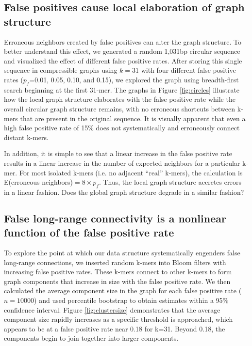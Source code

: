 \documentclass{pnastwo}
\begin{document}
\begin{article}
\subsection{False positives cause local elaboration of graph structure}

Erroneous neighbors created by false positives can alter the graph
structure.  To better understand this effect, we generated a random
1,031bp circular sequence and visualized the effect of different false
positive rates.  After storing this single sequence in compressible
graphs using $k=31$ with four different false positive rates
($p_f$=0.01, 0.05, 0.10, and 0.15), we explored the graph using
breadth-first search beginning at the first 31-mer.  The graphs in
Figure \ref{fig:circles} illustrate how the local graph structure
elaborates with the false positive rate while the overall circular
graph structure remains, with no erroneous shortcuts between k-mers
that are present in the original sequence.  It is visually apparent
that even a high false positive rate of 15\% does not systematically
and erroneously connect distant k-mers.

In addition, it is simple to see that a linear increase in the false
positive rate results in a linear increase in the number of expected
neighbors for a particular k-mer. For most isolated k-mers (i.e. no
adjacent ``real'' k-mers), the calculation is E(erroneous neighbors)$
= 8 \times p_f$. Thus, the local graph structure accretes errors in a
linear fashion.  Does the global graph structure degrade in a similar
fashion?

\subsection{False long-range connectivity is a nonlinear function of the false positive rate}

To explore the point at which our data structure systematically
engenders false long-range connections, we inserted random k-mers into
Bloom filters with increasing false positive rates.  These k-mers
connect to other k-mers to form graph components that increase in size
with the false positive rate.  We then calculated the average
component size in the graph for each false positive rate ($n=10000$)
and used percentile bootstrap to obtain estimates within a 95\%
confidence interval. Figure \ref{fig:clustersize} demonstrates that
the average component size rapidly increases as a specific threshold
is approached, which appears to be at a false positive rate near 0.18
for k=31. Beyond 0.18, the components begin to join together into
larger components.


\end{article}
\end{document}
